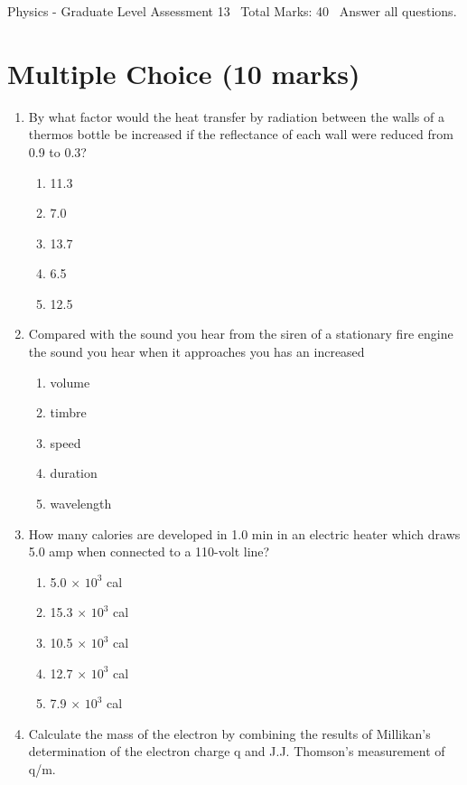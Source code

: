 \documentclass[12pt]{article}
\begin{document}
\begin{center}
Physics - Graduate Level Assessment 13 \
Total Marks: 40 \
Answer all questions.
\end{center}

\section*{Multiple Choice (10 marks)}
\begin{enumerate}[label=\arabic*.]
\item By what factor would the heat transfer by radiation between the walls of a thermos bottle be increased if the reflectance of each wall were reduced from 0.9 to 0.3?
\begin{enumerate}[label=(\alph*)]
    \item 11.3
    \item 7.0
    \item 13.7
    \item 6.5
    \item 12.5
\end{enumerate}
\item Compared with the sound you hear from the siren of a stationary fire engine the sound you hear when it approaches you has an increased
\begin{enumerate}[label=(\alph*)]
    \item volume
    \item timbre
    \item speed
    \item duration
    \item wavelength
\end{enumerate}
\item How many calories are developed in 1.0 min in an electric heater which draws 5.0 amp when connected to a 110-volt line?
\begin{enumerate}[label=(\alph*)]
    \item 5.0 \ensuremath{\times} $10^3$ cal
    \item 15.3 \ensuremath{\times} $10^3$ cal
    \item 10.5 \ensuremath{\times} $10^3$ cal
    \item 12.7 \ensuremath{\times} $10^3$ cal
    \item 7.9 \ensuremath{\times} $10^3$ cal
\end{enumerate}
\item Calculate the mass of the electron by combining the results of Millikan's determination of the electron charge q and J.J. Thomson's measurement of q/m.

\end{enumerate}
\end{document}

